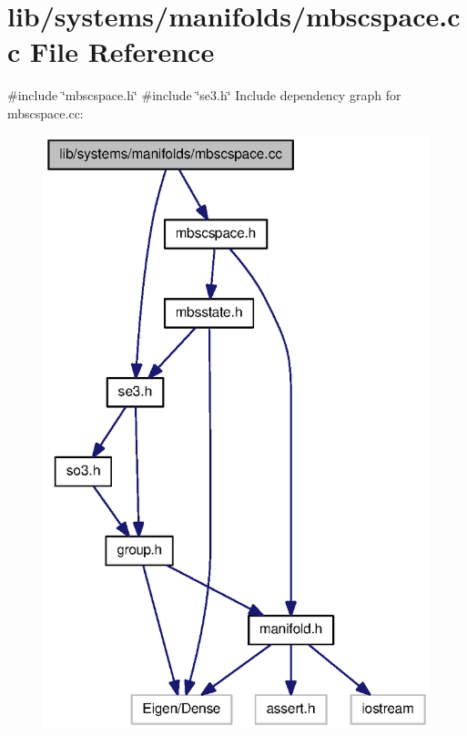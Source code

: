 \section{lib/systems/manifolds/mbscspace.cc \-File \-Reference}
\label{mbscspace_8cc}
{\ttfamily \#include \char`\"{}mbscspace.\-h\char`\"{}}\*
{\ttfamily \#include \char`\"{}se3.\-h\char`\"{}}\*
\-Include dependency graph for mbscspace.\-cc\-:
\nopagebreak
\begin{figure}[H]
\begin{center}
\leavevmode
\includegraphics[width=319pt]{mbscspace_8cc__incl}
\end{center}
\end{figure}
